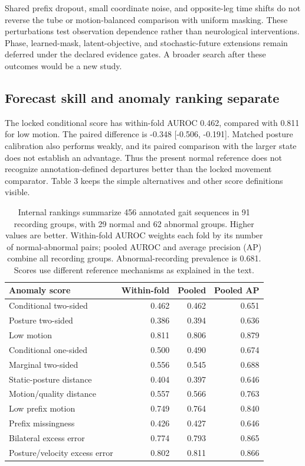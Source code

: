 \documentclass[letterpaper]{article}
\begin{document}
Shared prefix dropout, small coordinate noise, and opposite-leg time shifts do not reverse the tube or motion-balanced comparison with uniform masking. These perturbations test observation dependence rather than neurological interventions. Phase, learned-mask, latent-objective, and stochastic-future extensions remain deferred under the declared evidence gates. A broader search after these outcomes would be a new study.

\subsection{Forecast skill and anomaly ranking separate}

The locked conditional score has within-fold AUROC 0.462, compared with 0.811 for low motion. The paired difference is -0.348 [-0.506, -0.191]. Matched posture calibration also performs weakly, and its paired comparison with the larger state does not establish an advantage. Thus the present normal reference does not recognize annotation-defined departures better than the locked movement comparator. Table 3 keeps the simple alternatives and other score definitions visible.

\begin{table}[t]
\centering
\footnotesize
\setlength{\tabcolsep}{3pt}
\begin{tabular}{>{\raggedright\arraybackslash}p{}rrr}
\toprule
Anomaly score & Within-fold & Pooled & Pooled AP \\
\midrule
Conditional two-sided & 0.462 & 0.462 & 0.651 \\
Posture two-sided & 0.386 & 0.394 & 0.636 \\
Low motion & 0.811 & 0.806 & 0.879 \\
Conditional one-sided & 0.500 & 0.490 & 0.674 \\
Marginal two-sided & 0.556 & 0.545 & 0.688 \\
Static-posture distance & 0.404 & 0.397 & 0.646 \\
Motion/quality distance & 0.557 & 0.566 & 0.763 \\
Low prefix motion & 0.749 & 0.764 & 0.840 \\
Prefix missingness & 0.426 & 0.427 & 0.646 \\
Bilateral excess error & 0.774 & 0.793 & 0.865 \\
Posture/velocity excess error & 0.802 & 0.811 & 0.866 \\
\bottomrule
\end{tabular}
\caption{Internal rankings summarize 456 annotated gait sequences in 91 recording groups, with 29 normal and 62 abnormal groups. Higher values are better. Within-fold AUROC weights each fold by its number of normal-abnormal pairs; pooled AUROC and average precision (AP) combine all recording groups. Abnormal-recording prevalence is 0.681. Scores use different reference mechanisms as explained in the text.}
\label{tab:rankings}
\end{table}
\end{document}
